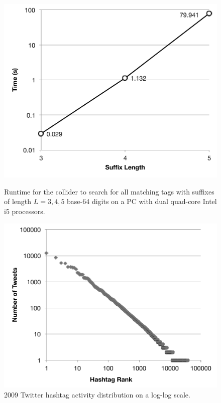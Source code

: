 \documentclass{sig-alternate-arxiv}
\begin{document}
\begin{figure}[t]
\begin{minipage}[b]{0.48\linewidth}
\centering
\includegraphics[scale=.5, viewport=0cm 0cm 16.6cm 13.6cm]{collider-times.pdf}
    \caption{Runtime for the collider to search for all matching tags with
  suffixes of length $L=3,4,5$ base-64 digits on a PC with dual quad-core Intel i5
  processors.}\label{fig:collider-times}
\end{minipage}
\hspace{0.5cm}
\begin{minipage}[b]{0.48\linewidth}
\centering
\includegraphics[scale=.5, viewport= 0cm 0cm 16.6cm 12.9cm]{hash-tag-dist.pdf}
\caption{2009 Twitter hashtag activity distribution on a log-log
  scale.\vspace{0.4cm}\label{fig:hash-dist}
}
\end{minipage}
\end{figure}
\end{document}
